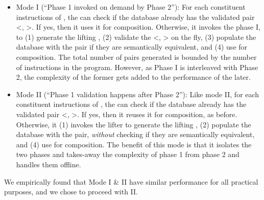 \begin{itemize}    

    \item Mode I (``Phase 1 invoked on demand by Phase 2''):
      For each constituent instructions  of , the \compd can check if
      the database already has the validated
        pair <, >. If yes, then it uses it for composition.
        Otherwise, it invokes the phase I, to (1) generate the lifting ,
        (2) validate the <, > on the fly, (3) populate the database
        with the pair if they are semantically equivalent, and (4) use 
        for composition. The total 
        number of pairs generated is bounded by the number of instructions in 
        the program. However, as Phase I is interleaved with Phase 2, the 
        complexity of the former gets added to the performance of the later.
        
            
        

    \item Mode II (``Phase 1 validation happens after Phase 2''): Like mode
        II, for each constituent instructions  of , the \compd can
        check if the database already has the validated pair <, >.
        If yes, then it reuses it for composition, as before.  Otherwise, it
        (1) invokes the lifter  to  generate the lifting , (2)
        populate the database with the pair, \emph{without} checking if they
        are semantically equivalent, and (4) use  for composition.  The
        benefit of this mode is that it isolates the two phases and takes-away
        the complexity of phase 1 from phase 2 and handles them offline. 

\end{itemize}
We empirically found that Mode I \& II have similar performance for all 
practical purposes, and we chose to proceed with II.
